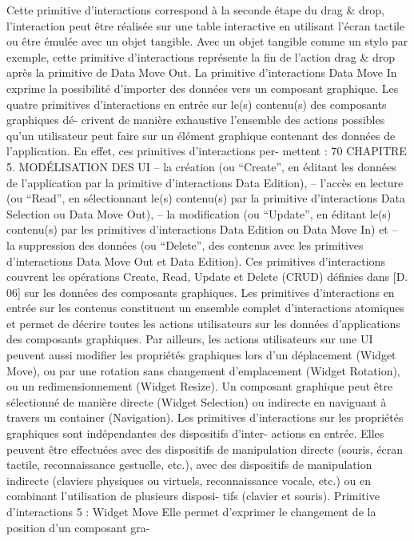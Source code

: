 \documentclass{article}
\begin{document}
Cette primitive d’interactions correspond à la seconde étape du drag & drop, l’interaction peut être
réalisée sur une table interactive en utilisant l’écran tactile ou être émulée avec un objet tangible.
Avec un objet tangible comme un stylo par exemple, cette primitive d’interactions représente la ﬁn de
l’action drag & drop après la primitive de Data Move Out. La primitive d’interactions Data Move
In exprime la possibilité d’importer des données vers un composant graphique.
Les quatre primitives d’interactions en entrée sur le(s) contenu(s) des composants graphiques dé-
crivent de manière exhaustive l’ensemble des actions possibles qu’un utilisateur peut faire sur un
élément graphique contenant des données de l’application. En effet, ces primitives d’interactions per-
mettent :
70
CHAPITRE 5. MODÉLISATION DES UI
– la création (ou “Create”, en éditant les données de l’application par la primitive d’interactions
Data Edition),
– l’accès en lecture (ou “Read”, en sélectionnant le(s) contenu(s) par la primitive d’interactions
Data Selection ou Data Move Out),
– la modiﬁcation (ou “Update”, en éditant le(s) contenu(s) par les primitives d’interactions Data
Edition ou Data Move In) et
– la suppression des données (ou “Delete”, des contenus avec les primitives d’interactions Data
Move Out et Data Edition).
Ces primitives d’interactions couvrent les opérations Create, Read, Update et Delete (CRUD) déﬁnies
dans [D. 06] sur les données des composants graphiques. Les primitives d’interactions en entrée sur
les contenus constituent un ensemble complet d’interactions atomiques et permet de décrire toutes les
actions utilisateurs sur les données d’applications des composants graphiques.
Par ailleurs, les actions utilisateurs sur une UI peuvent aussi modiﬁer les propriétés graphiques
lors d’un déplacement (Widget Move), ou par une rotation sans changement d’emplacement (Widget
Rotation), ou un redimensionnement (Widget Resize). Un composant graphique peut être sélectionné
de manière directe (Widget Selection) ou indirecte en naviguant à travers un container (Navigation).
Les primitives d’interactions sur les propriétés graphiques sont indépendantes des dispositifs d’inter-
actions en entrée. Elles peuvent être effectuées avec des dispositifs de manipulation directe (souris,
écran tactile, reconnaissance gestuelle, etc.), avec des dispositifs de manipulation indirecte (claviers
physiques ou virtuels, reconnaissance vocale, etc.) ou en combinant l’utilisation de plusieurs disposi-
tifs (clavier et souris).
Primitive d’interactions 5 : Widget Move
Elle permet d’exprimer le changement de la position d’un composant gra-
\end{document}
